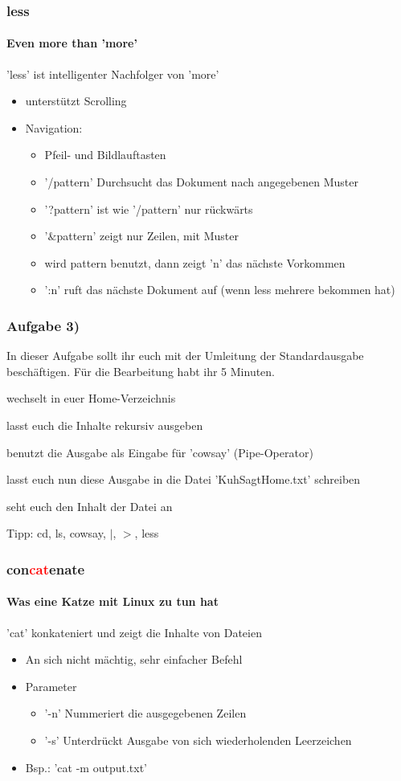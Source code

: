 \documentclass[12pt,utf8]{beamer}
\begin{document}
\begin{frame}
\frametitle{less}
\framesubtitle{\textcolor{ownDarkOr}{Even more than 'more'}}
'less' ist intelligenter Nachfolger von 'more'
\begin{itemize}
	\item unterstützt Scrolling
	\item Navigation:
	\begin{itemize}[<+->]
		\item Pfeil- und Bildlauftasten
		\item '/pattern' Durchsucht das Dokument nach angegebenen Muster
		\item '?pattern' ist wie '/pattern' nur rückwärts
		\item '$\&$pattern' zeigt nur Zeilen, mit Muster
		\item wird pattern benutzt, dann zeigt 'n' das nächste Vorkommen
		\item ':n' ruft das nächste Dokument auf (wenn less mehrere bekommen hat)
	\end{itemize}
\end{itemize}
\end{frame}

\begin{frame}
\frametitle{Aufgabe 3)}
In dieser Aufgabe sollt ihr euch mit der Umleitung der Standardausgabe beschäftigen. Für die Bearbeitung habt ihr 5 Minuten.
\begin{itemize}
	{\footnotesize
	\item wechselt in euer Home-Verzeichnis
	\item lasst euch die Inhalte rekursiv ausgeben
	\item benutzt die Ausgabe als Eingabe für 'cowsay' (Pipe-Operator)
	\item lasst euch nun diese Ausgabe in die Datei 'KuhSagtHome.txt' schreiben
	\item seht euch den Inhalt der Datei an
	}
\end{itemize}
{\scriptsize Tipp: cd, ls, cowsay, $\mid$, $>$, less}
\end{frame}

\begin{frame}
\frametitle{con\textcolor{red}{cat}enate}
\framesubtitle{\textcolor{ownDarkOr}{Was eine Katze mit Linux zu tun hat}}
'cat' konkateniert und zeigt die Inhalte von Dateien
\begin{itemize}[<+->]
	\item An sich nicht mächtig, sehr einfacher Befehl
	\item Parameter
	\begin{itemize}
		\item '-n' Nummeriert die ausgegebenen Zeilen 
		\item '-s' Unterdrückt Ausgabe von sich wiederholenden Leerzeichen
	\end{itemize}
	\item Bsp.: 'cat -m output.txt'
\end{itemize}
\end{frame}
\end{document}
